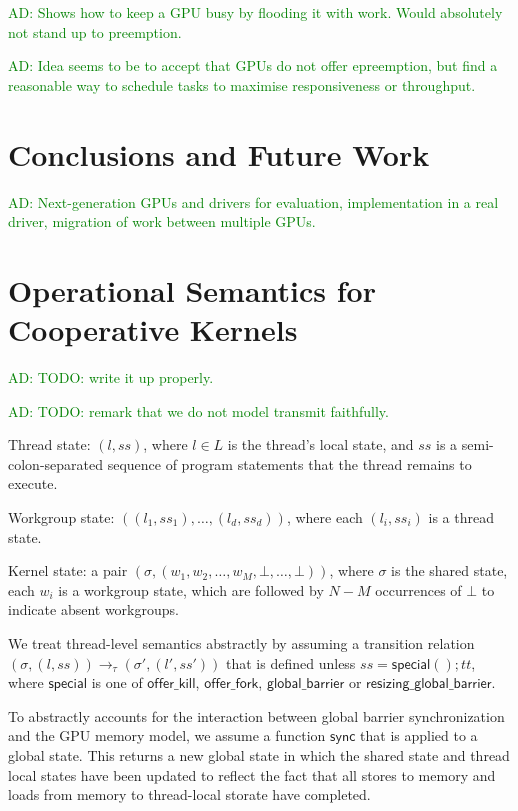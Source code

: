 \documentclass[nocopyrightspace,10pt]{sigplanconf}
\newcommand{\ADComment}[1]{\textcolor{green}{AD: #1}}
\newcommand{\offerfork}{\mathsf{offer\_fork}}
\newcommand{\offerkill}{\mathsf{offer\_kill}}
\newcommand{\globalbarrier}{\mathsf{global\_barrier}}
\newcommand{\resizingglobalbarrier}{\mathsf{resizing\_global\_barrier}}
\begin{document}
\cite{DBLP:journals/tog/SteinbergerKBKDS14} \ADComment{Shows how to
  keep a GPU busy by flooding it with work.  Would absolutely not
  stand up to preemption.}

\cite{DBLP:conf/usenix/KatoLRI11} \ADComment{Idea seems to be to
  accept that GPUs do not offer epreemption, but find a reasonable way
  to schedule tasks to maximise responsiveness or throughput.}


\section{Conclusions and Future Work}\label{sec:conclusion}

\ADComment{Next-generation GPUs and drivers for evaluation,
  implementation in a real driver, migration of work between multiple
  GPUs.}

\clearpage




\appendix

\section{Operational Semantics for Cooperative Kernels}\label{appendix:semantics}

\ADComment{TODO: write it up properly.}

\ADComment{TODO: remark that we do not model transmit faithfully.}

Thread state: $(l, \mathit{ss})$, where $l \in L$ is the thread's
local state, and $\mathit{ss}$ is a semi-colon-separated sequence of
program statements that the thread remains to execute.

Workgroup state: $((l_1, \mathit{ss}_1), \dots, (l_d,
\mathit{ss}_d))$, where each $(l_i, \mathit{ss}_i)$ is a thread state.

Kernel state: a pair $(\sigma, (w_1, w_2, \dots, w_M, \bot, \dots, \bot))$, where $\sigma$ is the shared state,
each $w_i$ is a workgroup state, which are
followed by $N-M$ occurrences of $\bot$ to indicate absent workgroups.

We treat thread-level semantics abstractly by assuming a transition
relation $(\sigma, (l, \mathit{ss})) \rightarrow_{\tau} (\sigma', (l',
\mathit{ss}'))$ that is defined unless $\mathit{ss} =
\mathsf{special}(); \mathit{tt}$, where $\mathsf{special}$ is one of
$\offerkill$, $\offerfork$, $\globalbarrier$ or
$\resizingglobalbarrier$.

To abstractly accounts for the interaction between global barrier
synchronization and the GPU memory model, we assume a function
$\mathsf{sync}$ that is applied to a global state.  This returns a new
global state in which the shared state and thread local states have
been updated to reflect the fact that all stores to memory and loads
from memory to thread-local storate have completed.
\end{document}
